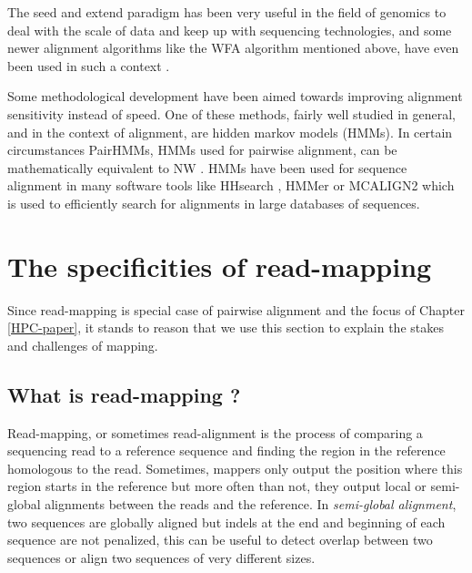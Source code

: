 \documentclass[
  11pt,
  twoside,
  BCOR=10mm,
  listof=totoc]{scrbook}
\begin{document}
The seed and extend paradigm has been very useful in the field of genomics to deal with the scale of data and keep up with sequencing technologies, and some newer alignment algorithms like the WFA algorithm mentioned above, have even been used in such a context \autocite{songAnchorWaveSensitiveAlignment2022}.

Some methodological development have been aimed towards improving alignment sensitivity instead of speed. One of these methods, fairly well studied in general, and in the context of alignment, are hidden markov models (HMMs). In certain circumstances PairHMMs, HMMs used for pairwise alignment, can be mathematically equivalent to NW \autocite{durbinBiologicalSequenceAnalysis1998}. HMMs have been used for sequence alignment in many software tools like HHsearch \autocite{sodingProteinHomologyDetection2005}, HMMer \autocite{finnHMMERWebServer2011} or MCALIGN2 \autocite{wangMCALIGN2FasterAccurate2006} which is used to efficiently search for alignments in large databases of sequences.

\hypertarget{the-specificities-of-read-mapping}{%
\section{The specificities of read-mapping}\label{the-specificities-of-read-mapping}}

Since read-mapping is special case of pairwise alignment and the focus of Chapter \ref{HPC-paper}, it stands to reason that we use this section to explain the stakes and challenges of mapping.

\hypertarget{what-is-read-mapping}{%
\subsection{What is read-mapping ?}\label{what-is-read-mapping}}

Read-mapping, or sometimes read-alignment is the process of comparing a sequencing read to a reference sequence and finding the region in the reference homologous to the read. Sometimes, mappers only output the position where this region starts in the reference but more often than not, they output local or semi-global alignments between the reads and the reference. In \emph{semi-global alignment}, two sequences are globally aligned but indels at the end and beginning of each sequence are not penalized, this can be useful to detect overlap between two sequences or align two sequences of very different sizes.
\end{document}

